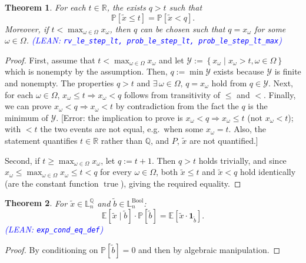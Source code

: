 \documentclass[letterpaper]{article}
\theoremstyle{plain}
\newtheorem{theorem}{Theorem}[subsection]
\theoremstyle{definition}
\theoremstyle{remark}
\newcommand{\Real}{\mathbb{R}}
\newcommand{\E}{\mathbb{E}}
\newcommand{\PP}{\mathbb{P}}
\DeclareMathOperator{\bool}{Bool}
\DeclareMathOperator{\true}{true}
\newcommand{\cc}[1]{\textcolor{ccolor}{[#1]}}
\newcommand{\lean}[1]{\textcolor{blue}{(\emph{LEAN}: \texttt{#1})}}
\newcommand{\leanok}{}
\begin{document}
\begin{theorem} \label{lem:prob-increase}
  For each $t\in \Real$, the exists $q > t$ such that
  \[
   \PP[\tilde{x} \le t] =
   \PP[\tilde{x} < q].
 \]
 Moreover, if $t < \max_{\omega \in \Omega } x_{\omega }$, then $q$ can be chosen such that $q= x_{\omega}$ for some $\omega\in \Omega$.
 \lean{rv\_le\_step\_lt, prob\_le\_step\_lt, prob\_le\_step\_lt\_max} \leanok
\end{theorem}
\begin{proof}
  First, assume that $t < \max_{\omega \in \Omega } x_{\omega }$ and let $\mathcal{Y} := \left\{ x_{\omega} \mid x_{\omega} > t, \omega \in \Omega  \right\}$ which is nonempty by the assumption. Then, $q := \min \mathcal{Y}$ exists because $\mathcal{Y}$ is finite and nonempty. The properties $q > t$ and $\exists \,\omega \in \Omega, \, q = x_{\omega}$ hold from $q\in \mathcal{Y}$. Next, for each $\omega \in \Omega$, $x_{\omega}\le t \Rightarrow x_{\omega} < q$ follows from transitivity of $\le$ and $<$.  Finally, we can prove $x_{\omega} < q \Rightarrow x_{\omega} < t$ by contradiction from the fact the $q$ is the minimum of $\mathcal{Y}$.
 \cc{Error: the implication to prove is $x_{\omega} < q \Rightarrow x_{\omega} \le t$ (not $x_{\omega} < t$); with $<t$ the two events are not equal, e.g.\ when some $x_{\omega} = t$. Also, the statement quantifies $t\in \Real$ rather than $\mathbb{Q}$, and $P$, $\tilde{x}$ are not quantified.}

 Second, if $t \ge \max_{\omega \in \Omega } x_{\omega }$, let $q := t + 1$. Then $q > t$ holds trivially, and since $x_{\omega} \le \max_{\omega \in \Omega} x_{\omega} \le t < q$ for every $\omega \in \Omega$, both $\tilde{x} \le t$ and $\tilde{x} < q$ hold identically (are the constant function $\true$), giving the required equality.
\end{proof}

\begin{theorem} \label{thm:exp_cond_eq_def}
 For $\tilde{x} \in \mathbb{L}_n^{\mathbb{Q}}$ and $\tilde{b} \in \mathbb{L}_n^{\bool}$:
  \[
     \E\left[\tilde{x} \mid \tilde{b} \right] \cdot  \PP\left[\tilde{b}\right] = \E\left[\tilde{x} \cdot  \bm{1}_{\tilde{b}}\right].
  \]
  \lean{exp\_cond\_eq\_def} \leanok
\end{theorem}
\begin{proof}
By conditioning on $\PP\left[\tilde{b}\right] = 0$ and then by algebraic manipulation.
\end{proof}
\end{document}
